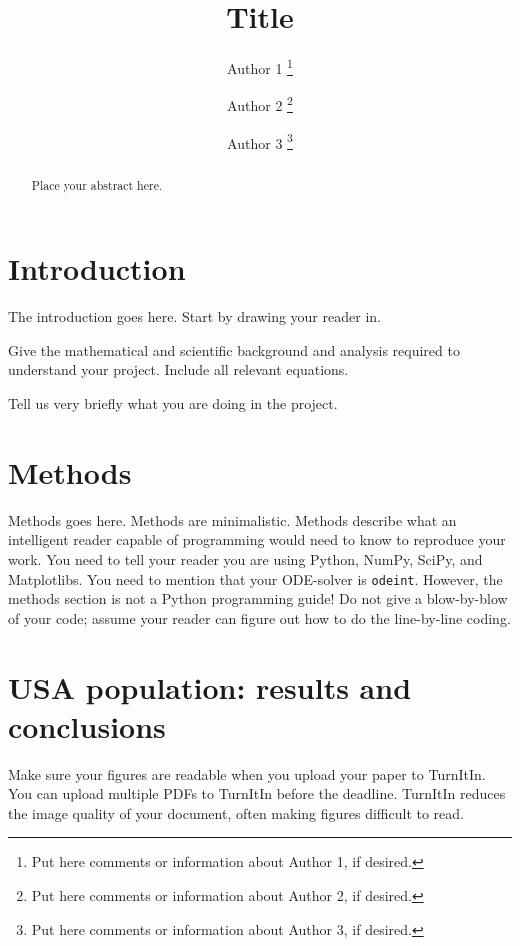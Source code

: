\documentclass[english]{article}
\begin{document}
\title{Title}

\author{
  Author 1 \thanks{Put here comments or information about Author 1, if desired.} \and
  Author 2 \thanks{Put here comments or information about Author 2, if desired.} \and
  Author 3 \thanks{Put here comments or information about Author 3, if desired.}
}

\maketitle

\begin{abstract}
  Place your abstract here. 
\end{abstract}

\section{Introduction}\label{introduction}
The introduction goes here.  Start by drawing your reader in.  

Give the mathematical and scientific background and analysis required
to understand your project.  Include all relevant equations.

Tell us very briefly what you are doing in the project.
 
\section{Methods}\label{methods}
Methods goes here.  Methods are minimalistic.  Methods describe what
an intelligent reader capable of programming would need to know to
reproduce your work. You need to tell your reader you are using
Python, NumPy, SciPy, and Matplotlibs.  You need to mention that your
ODE-solver is \verb+odeint+.  However, the methods section is not a
Python programming guide!  Do not give a blow-by-blow of your code;
assume your reader can figure out how to do the line-by-line coding.

\section{USA population: results and conclusions}
Make sure your figures are readable when you upload your paper to
TurnItIn.  You can upload multiple PDFs to TurnItIn before the
deadline.  TurnItIn reduces the image quality of your document, often
making figures difficult to read.
\end{document}
